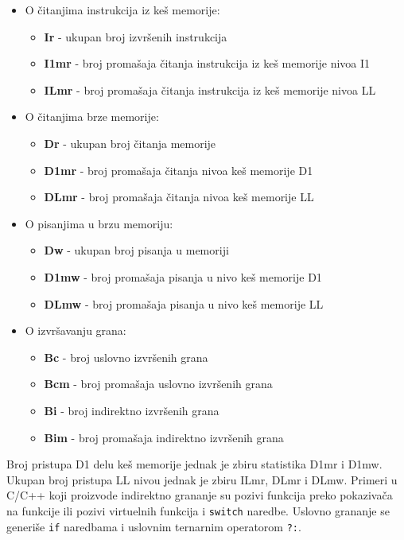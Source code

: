 \begin{itemize}
\tightlist
\item
  O čitanjima instrukcija iz keš memorije:

  \begin{itemize}
  \tightlist
  \item
    \textbf{Ir} - ukupan broj izvršenih instrukcija
  \item
    \textbf{I1mr} - broj promašaja čitanja instrukcija iz keš memorije nivoa I1
  \item
    \textbf{ILmr} - broj promašaja čitanja instrukcija iz keš memorije nivoa LL
  \end{itemize}
\item
  O čitanjima brze memorije:

  \begin{itemize}
  \tightlist
  \item
    \textbf{Dr} - ukupan broj čitanja memorije
  \item
    \textbf{D1mr} - broj promašaja čitanja nivoa keš memorije D1
  \item
    \textbf{DLmr} - broj promašaja čitanja nivoa keš memorije LL
  \end{itemize}
\item
  O pisanjima u brzu memoriju:

  \begin{itemize}
  \tightlist
  \item
    \textbf{Dw} - ukupan broj pisanja u memoriji
  \item
    \textbf{D1mw} - broj promašaja pisanja u nivo keš memorije D1
  \item
    \textbf{DLmw} - broj promašaja pisanja u nivo keš memorije LL
  \end{itemize}
\item
  O izvršavanju grana:

  \begin{itemize}
  \tightlist
  \item
    \textbf{Bc} - broj uslovno izvršenih grana
  \item
    \textbf{Bcm} - broj promašaja uslovno izvršenih grana
  \item
    \textbf{Bi} - broj indirektno izvršenih grana
  \item
    \textbf{Bim} - broj promašaja indirektno izvršenih grana
  \end{itemize}
\end{itemize}

Broj pristupa D1 delu keš memorije jednak je zbiru statistika D1mr i D1mw. Ukupan broj pristupa LL nivou jednak je zbiru ILmr, DLmr i DLmw. Primeri u C/C++ koji proizvode indirektno grananje su pozivi funkcija preko pokazivača na funkcije ili pozivi virtuelnih funkcija i \texttt{switch} naredbe. Uslovno grananje se generiše \texttt{if} naredbama i uslovnim ternarnim operatorom \texttt{?:}.


